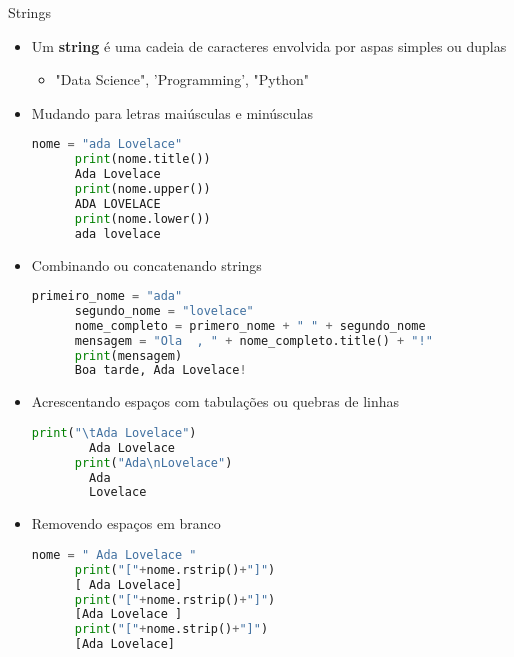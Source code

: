 \begin{frame}{Strings}
  \begin{itemize}
    \item Um {\bf string} é uma cadeia de caracteres envolvida por aspas simples ou duplas
    \begin{itemize}
      \item "Data Science", 'Programming', "Python"
    \end{itemize}
    \item Mudando para letras maiúsculas e minúsculas
    \begin{lstlisting}[language=python]
      nome = "ada Lovelace"
      print(nome.title())
      Ada Lovelace
      print(nome.upper())
      ADA LOVELACE
      print(nome.lower())
      ada lovelace
    \end{lstlisting}
    \pagebreak
    \item Combinando ou concatenando strings
    \begin{lstlisting}[language=python]
      primeiro_nome = "ada"
      segundo_nome = "lovelace"
      nome_completo = primero_nome + " " + segundo_nome
      mensagem = "Ola  , " + nome_completo.title() + "!"
      print(mensagem)
      Boa tarde, Ada Lovelace!
    \end{lstlisting}
    \item Acrescentando espaços com tabulações ou quebras de linhas
    \begin{lstlisting}[language=python]
      print("\tAda Lovelace")
        Ada Lovelace
      print("Ada\nLovelace")
        Ada
        Lovelace
    \end{lstlisting}
    \pagebreak
    \item Removendo espaços em branco
    \begin{lstlisting}[language=python]
      nome = " Ada Lovelace " 
      print("["+nome.rstrip()+"]")
      [ Ada Lovelace]
      print("["+nome.rstrip()+"]")
      [Ada Lovelace ]
      print("["+nome.strip()+"]")
      [Ada Lovelace]
    \end{lstlisting}
  \end{itemize}
\end{frame}

 